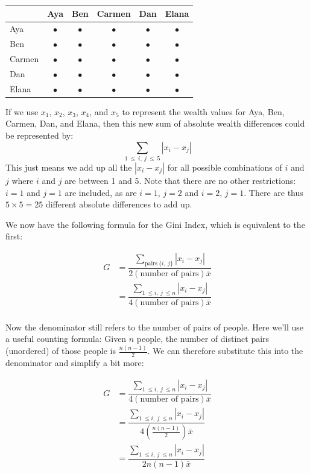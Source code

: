 \documentclass[12pt]{memoir}\usepackage[]{graphicx}\usepackage[table]{xcolor}
\begin{document}
\begin{center}
\begin{tabular}{|l|c|c|c|c|c|}
\toprule
     & Aya & Ben & Carmen & Dan & Elana \\ \midrule 
Aya    & $\bullet$ & $\bullet$  &  $\bullet$ & $\bullet$ & $\bullet$ \\ \midrule
Ben    & $\bullet$ & $\bullet$  &  $\bullet$ & $\bullet$ & $\bullet$   \\ \midrule 
Carmen & $\bullet$ & $\bullet$  &  $\bullet$ & $\bullet$ & $\bullet$ \\ \midrule
Dan    & $\bullet$ & $\bullet$  &  $\bullet$ & $\bullet$ & $\bullet$ \\ \midrule
Elana  & $\bullet$ & $\bullet$  &  $\bullet$ & $\bullet$ & $\bullet$     \\ \bottomrule
\end{tabular}
\end{center}

If we use $x_1$, $x_2$, $x_3$, $x_4$, and $x_5$ to represent the wealth values
for Aya, Ben, Carmen, Dan, and Elana, then this new sum of absolute wealth
differences could be represented by: 
$$\sum_{1\ \le\ i,\ j\ \le\ 5} |x_i - x_j|$$
This just means we add up all the $|x_i - x_j|$ for all possible 
combinations of $i$ and $j$ where $i$ and $j$ are between 1 and 5.  
Note that there are no other restrictions:  $i = 1$ and $j = 1$ are 
included, as are $i = 1$, $j = 2$ and $i = 2$, $j = 1$.  There are 
thus $5\times 5 = 25$ different absolute differences to add up. 

We now have the following formula for the Gini Index, which is equivalent
to the first: 

\begin{align*}
G &= \dfrac{\displaystyle\sum_{\text{pairs}\ \{i,\ j\}} |x_i - x_j|}{2(\text{number of pairs})\bar{x}} \\[10pt]
  &= \dfrac{\displaystyle\sum_{1\ \le i,\ j\ \le n} |x_i - x_j|}{4(\text{number of pairs})\bar{x}} \\
\end{align*}

Now the denominator still refers to the number of pairs of people.  Here we'll use a
useful counting formula:  Given $n$ people, the number of distinct pairs (unordered)
of those people is $\frac{n(n - 1)}{2}$.  We can therefore substitute this into the 
denominator and simplify a bit more: 

\begin{align*}
G &= \dfrac{\displaystyle \sum_{1\ \le i,\ j\ \le n} |x_i - x_j | }{ 4(\text{number of pairs})\bar{x}} \\[12pt]
  &= \dfrac{\displaystyle \sum_{1\ \le i,\ j\ \le n} |x_i - x_j | }{ 4(\frac{n(n - 1)}{2} )\bar{x} } \\[12pt]
  &= \dfrac{\displaystyle \sum_{1\ \le i,\ j\ \le n} |x_i - x_j | }{ 2n(n - 1)\bar{x} } \\
\end{align*}
\end{document}
